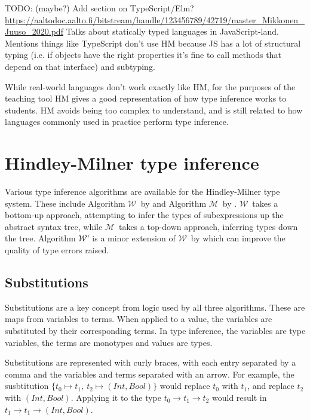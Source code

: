 \documentclass[a4paper,fleqn,oneside,12pt]{report}
\newcommand{\W}{$\mathcal{W}$}
\newcommand{\M}{$\mathcal{M}$}
\begin{document}
TODO: (maybe?) Add section on TypeScript/Elm?
\underline{\href{https://aaltodoc.aalto.fi/bitstream/handle/123456789/42719/master\_Mikkonen\_Juuso\_2020.pdf}{https://aaltodoc.aalto.fi/bitstream/handle/123456789/42719/master\_Mikkonen\_Juuso\_2020.pdf}}
Talks about statically typed languages in JavaScript-land. Mentions things like TypeScript don’t use HM because JS has a lot of structural typing (i.e. if objects have the right properties it’s fine to call methods that depend on that interface) and subtyping.

While real-world languages don't work exactly like HM, for the purposes of the teaching tool HM gives a good representation of how type inference works to students. HM avoids being too complex to understand, and is still related to how languages commonly used in practice perform type inference.

\section{Hindley-Milner type inference}\label{id:h.admfqf7bhkct}

Various type inference algorithms are available for the Hindley-Milner type system. These include Algorithm \W\ by \cite{ref26} and Algorithm \M\ by \cite{ref27}. \W\ takes a bottom-up approach, attempting to infer the types of subexpressions up the abstract syntax tree, while \M\ takes a top-down approach, inferring types down the tree. Algorithm \W' is a minor extension of \W\ by \cite{ref28} which can improve the quality of type errors raised.

\subsection{Substitutions}

Substitutions are a key concept from logic used by all three algorithms. These are maps from variables to terms. When applied to a value, the variables are substituted by their corresponding terms. In type inference, the variables are type variables, the terms are monotypes and values are types.

Substitutions are represented with curly braces, with each entry separated by a comma and the variables and terms separated with an arrow. For example, the susbtitution $\{ t_0 \mapsto t_1,\ t_2 \mapsto (Int, Bool) \}$ would replace $t_0$ with $t_1$, and replace $t_2$ with $(Int, Bool)$. Applying it to the type $t_0 \rightarrow t_1 \rightarrow t_2$ would result in $t_1 \rightarrow t_1 \rightarrow (Int, Bool)$.
\end{document}
